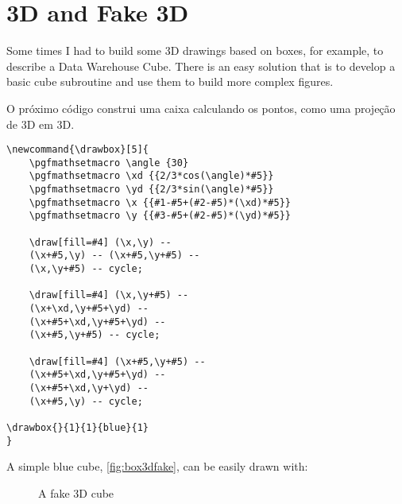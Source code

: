 \chapter{3D and Fake 3D}

Some times I had to build some 3D drawings based on boxes, for example, to describe a Data Warehouse Cube. There is an easy solution that is to develop a basic cube subroutine and use them to build more complex figures.

O próximo código construi uma caixa calculando os pontos, como uma projeção de 3D em 3D.

\begin{lstlisting}[style=myLateX,caption=Cubo azul em Fake 3D]
\newcommand{\drawbox}[5]{
    \pgfmathsetmacro \angle {30}
    \pgfmathsetmacro \xd {{2/3*cos(\angle)*#5}}
    \pgfmathsetmacro \yd {{2/3*sin(\angle)*#5}}
    \pgfmathsetmacro \x {{#1-#5+(#2-#5)*(\xd)*#5}}
    \pgfmathsetmacro \y {{#3-#5+(#2-#5)*(\yd)*#5}}

    \draw[fill=#4] (\x,\y) --
    (\x+#5,\y) -- (\x+#5,\y+#5) --
    (\x,\y+#5) -- cycle;

    \draw[fill=#4] (\x,\y+#5) --
    (\x+\xd,\y+#5+\yd) --
    (\x+#5+\xd,\y+#5+\yd) --
    (\x+#5,\y+#5) -- cycle;

    \draw[fill=#4] (\x+#5,\y+#5) --
    (\x+#5+\xd,\y+#5+\yd) --
    (\x+#5+\xd,\y+\yd) --
    (\x+#5,\y) -- cycle;

\drawbox{}{1}{1}{blue}{1}
}
\end{lstlisting}

\newcommand{\drawbox}[5]{
    \pgfmathsetmacro \angle {30}
    \pgfmathsetmacro \xd {{2/3*cos(\angle)*#5}}
    \pgfmathsetmacro \yd {{2/3*sin(\angle)*#5}}
    \pgfmathsetmacro \x {{#1-#5+(#2-#5)*(\xd)*#5}}
    \pgfmathsetmacro \y {{#3-#5+(#2-#5)*(\yd)*#5}}

    \draw[fill=#4] (\x,\y) -- (\x+#5,\y) -- (\x+#5,\y+#5) -- (\x,\y+#5) -- cycle;

    \draw[fill=#4] (\x,\y+#5) -- (\x+\xd,\y+#5+\yd) -- (\x+#5+\xd,\y+#5+\yd) -- (\x+#5,\y+#5) -- cycle;

    \draw[fill=#4] (\x+#5,\y+#5) -- (\x+#5+\xd,\y+#5+\yd) -- (\x+#5+\xd,\y+\yd) -- (\x+#5,\y) -- cycle;
}


A simple blue cube, \autoref{fig:box3dfake}, can be easily drawn with:



\begin{figure}[hbt]
    \centering
    \caption{A fake 3D cube}
    \label{fig:box3dfake}
\end{figure}

